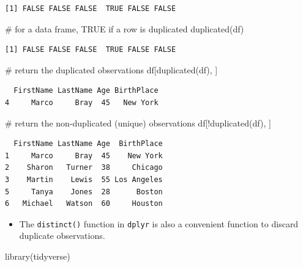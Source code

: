 \documentclass[
  letterpaper,
  DIV=11,
  numbers=noendperiod]{scrreprt}
\newenvironment{Shaded}{\begin{snugshade}}{\end{snugshade}}
\newcommand{\CommentTok}[1]{\textcolor[rgb]{0.37,0.37,0.37}{#1}}
\newcommand{\FunctionTok}[1]{\textcolor[rgb]{0.28,0.35,0.67}{#1}}
\newcommand{\NormalTok}[1]{\textcolor[rgb]{0.00,0.23,0.31}{#1}}
\newcommand{\SpecialCharTok}[1]{\textcolor[rgb]{0.37,0.37,0.37}{#1}}
\providecommand{\tightlist}{%
  \setlength{\itemsep}{0pt}\setlength{\parskip}{0pt}}\usepackage{longtable,booktabs,array}
\begin{document}
\begin{verbatim}
[1] FALSE FALSE FALSE  TRUE FALSE FALSE
\end{verbatim}

\begin{Shaded}
\begin{Highlighting}[]
\CommentTok{\# for a data frame, TRUE if a row is duplicated}
\FunctionTok{duplicated}\NormalTok{(df)   }
\end{Highlighting}
\end{Shaded}

\begin{verbatim}
[1] FALSE FALSE FALSE  TRUE FALSE FALSE
\end{verbatim}

\begin{Shaded}
\begin{Highlighting}[]
\CommentTok{\# return the duplicated observations}
\NormalTok{df[}\FunctionTok{duplicated}\NormalTok{(df), ]}
\end{Highlighting}
\end{Shaded}

\begin{verbatim}
  FirstName LastName Age BirthPlace
4     Marco     Bray  45   New York
\end{verbatim}

\begin{Shaded}
\begin{Highlighting}[]
\CommentTok{\# return the non{-}duplicated (unique) observations}
\NormalTok{df[}\SpecialCharTok{!}\FunctionTok{duplicated}\NormalTok{(df), ] }
\end{Highlighting}
\end{Shaded}

\begin{verbatim}
  FirstName LastName Age  BirthPlace
1     Marco     Bray  45    New York
2    Sharon   Turner  38     Chicago
3    Martin    Lewis  55 Los Angeles
5     Tanya    Jones  28      Boston
6   Michael   Watson  60     Houston
\end{verbatim}

\begin{itemize}
\tightlist
\item
  The \texttt{distinct()} function in \texttt{dplyr} is also a
  convenient function to discard duplicate observations.
\end{itemize}

\begin{Shaded}
\begin{Highlighting}[]
\FunctionTok{library}\NormalTok{(tidyverse)}
\end{Highlighting}
\end{Shaded}
\end{document}
